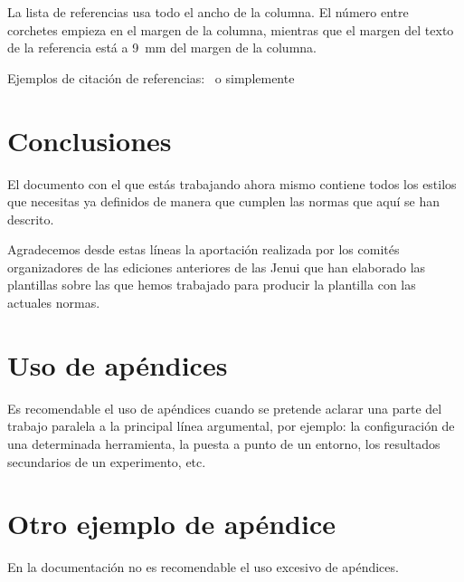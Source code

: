 \documentclass[twocolumn,twoside,a4paper, 10pt]{article}
\begin{document}
La lista de referencias usa todo el ancho de la columna.  El número 
entre corchetes empieza en el margen de la columna, mientras que el margen
del texto de la referencia está a 9~mm del margen de la columna.

Ejemplos de citación de referencias:~\cite{Hennessy2011,MARS} o simplemente~\cite{Kane}
\section{Conclusiones}

El documento con el que estás trabajando ahora 
mismo contiene todos los estilos que necesitas ya definidos de manera que 
cumplen las normas que aquí se han descrito.

Agradecemos desde estas líneas la aportación realizada por los comités 
organizadores de las ediciones anteriores de las Jenui que han elaborado 
las plantillas sobre las que hemos trabajado para producir la plantilla 
con las actuales normas.


\appendix

\section{Uso de apéndices}
Es recomendable el uso de apéndices cuando se pretende aclarar una parte del trabajo paralela a la principal línea argumental, por ejemplo: la configuración de una determinada herramienta, la puesta a punto de un entorno, los resultados secundarios de un experimento, etc.

\section{Otro ejemplo de apéndice}
En la documentación no es recomendable el uso excesivo de apéndices.




\end{document}
